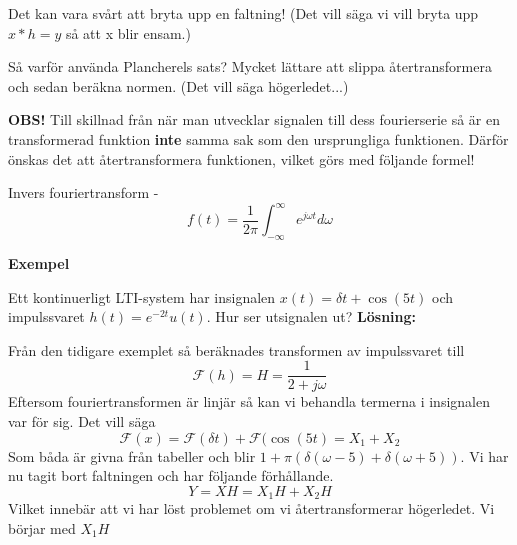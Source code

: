 \documentclass{article}
\begin{document}
Det kan vara svårt att bryta upp en faltning!
(Det vill säga vi vill bryta upp $x*h=y$ så att x blir ensam.)

Så varför använda Plancherels sats? Mycket lättare att slippa återtransformera
och sedan beräkna normen. (Det vill säga högerledet...)

\textbf{OBS!} Till skillnad från när man utvecklar signalen till dess
fourierserie så är en transformerad funktion \textbf{inte} samma sak
som den ursprungliga funktionen.
Därför önskas det att återtransformera funktionen, vilket görs med följande formel!

Invers fouriertransform -
\begin{displaymath}
  f(t) = \frac{1}{2 \pi} \int_{-\infty}^{\infty}  e^{j \omega t} d\omega
\end{displaymath}

\textbf{Exempel} %

Ett kontinuerligt LTI-system har insignalen $x(t)=\delta{t} + \cos(5 t)$
och impulssvaret $h(t) = e^{-2 t} u(t)$. Hur ser utsignalen ut?
\textbf{Lösning:}

Från den tidigare exemplet så beräknades transformen av impulssvaret till
\begin{displaymath}
  \mathcal{F}(h) = H = \frac{1}{2+j \omega}
\end{displaymath}
Eftersom fouriertransformen är linjär så kan vi behandla termerna i
insignalen var för sig. Det vill säga
\begin{displaymath}
  \mathcal{F} (x) = \mathcal{F}(\delta{t}) + \mathcal{F}(\cos(5 t) = X_1 + X_2
\end{displaymath}
Som båda är givna från tabeller och blir
$1+\pi(\delta(\omega - 5) + \delta(\omega + 5))$.
Vi har nu tagit bort faltningen och har följande förhållande.
\begin{displaymath}
  Y = X H = X_1 H + X_2 H
\end{displaymath}
Vilket innebär att vi har löst problemet om vi återtransformerar högerledet.
Vi börjar med $X_1 H$
\end{document}
